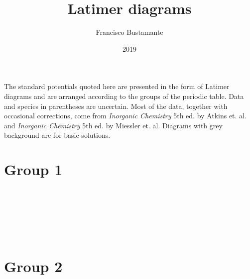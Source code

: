 \documentclass[10pt, a4paper]{article}
\author{Francisco Bustamante}
\title{Latimer diagrams}
\date{2019}
\begin{document}
The standard potentials quoted here are presented in the form of Latimer diagrams
 and are arranged according to the groups of the periodic table. Data and species in parentheses are uncertain. Most of the data, together with
occasional corrections, come from \textit{Inorganic Chemistry} 5th ed. by Atkins et. al. and \textit{Inorganic Chemistry} 5th ed. by Miessler et. al.
 \colorbox{gray!20}{Diagrams with grey background are for basic solutions}.

\section*{Group 1}
\label{sec:group1}


\begin{minipage}{0.5\textwidth} 





\end{minipage}
\begin{minipage}{0.5\textwidth} 
	\colorbox{gray!20}{
}
\\ \\ \\ \\ \\
\end{minipage}

\section*{Group 2}
\label{sec:group2}

\begin{minipage}{0.5\textwidth} 





\end{minipage}
\begin{minipage}{0.5\textwidth} 
	\colorbox{gray!20}{  }

	\colorbox{gray!20}{  }

	\colorbox{gray!20}{  }

	\colorbox{gray!20}{  }

	\colorbox{gray!20}{  }
	\\
\end{minipage}
\end{document}
